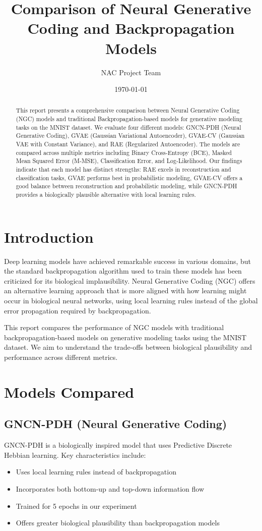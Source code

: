 \documentclass[11pt,a4paper]{article}
\title{Comparison of Neural Generative Coding and Backpropagation Models}
\author{NAC Project Team}
\date{\today}
\begin{document}
\maketitle

\begin{abstract}
This report presents a comprehensive comparison between Neural Generative Coding (NGC) models and traditional Backpropagation-based models for generative modeling tasks on the MNIST dataset. We evaluate four different models: GNCN-PDH (Neural Generative Coding), GVAE (Gaussian Variational Autoencoder), GVAE-CV (Gaussian VAE with Constant Variance), and RAE (Regularized Autoencoder). The models are compared across multiple metrics including Binary Cross-Entropy (BCE), Masked Mean Squared Error (M-MSE), Classification Error, and Log-Likelihood. Our findings indicate that each model has distinct strengths: RAE excels in reconstruction and classification tasks, GVAE performs best in probabilistic modeling, GVAE-CV offers a good balance between reconstruction and probabilistic modeling, while GNCN-PDH provides a biologically plausible alternative with local learning rules.
\end{abstract}

\section{Introduction}

Deep learning models have achieved remarkable success in various domains, but the standard backpropagation algorithm used to train these models has been criticized for its biological implausibility. Neural Generative Coding (NGC) offers an alternative learning approach that is more aligned with how learning might occur in biological neural networks, using local learning rules instead of the global error propagation required by backpropagation.

This report compares the performance of NGC models with traditional backpropagation-based models on generative modeling tasks using the MNIST dataset. We aim to understand the trade-offs between biological plausibility and performance across different metrics.

\section{Models Compared}

\subsection{GNCN-PDH (Neural Generative Coding)}
GNCN-PDH is a biologically inspired model that uses Predictive Discrete Hebbian learning. Key characteristics include:
\begin{itemize}
    \item Uses local learning rules instead of backpropagation
    \item Incorporates both bottom-up and top-down information flow
    \item Trained for 5 epochs in our experiment
    \item Offers greater biological plausibility than backpropagation models
\end{itemize}
\end{document}
